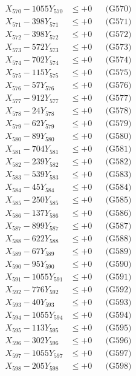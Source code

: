 \documentclass[a4paper,10pt]{article}
\begin{document}
{\begin{align}
X_{570} - 1055Y_{570} &\leq +0 && \text{(G570)} \\
\allowbreak
X_{571} - 398Y_{571} &\leq +0 && \text{(G571)} \\
X_{572} - 398Y_{572} &\leq +0 && \text{(G572)} \\
X_{573} - 572Y_{573} &\leq +0 && \text{(G573)} \\
X_{574} - 702Y_{574} &\leq +0 && \text{(G574)} \\
X_{575} - 115Y_{575} &\leq +0 && \text{(G575)} \\
X_{576} - 57Y_{576} &\leq +0 && \text{(G576)} \\
X_{577} - 912Y_{577} &\leq +0 && \text{(G577)} \\
X_{578} - 24Y_{578} &\leq +0 && \text{(G578)} \\
X_{579} - 62Y_{579} &\leq +0 && \text{(G579)} \\
X_{580} - 89Y_{580} &\leq +0 && \text{(G580)} \\
\allowbreak
X_{581} - 704Y_{581} &\leq +0 && \text{(G581)} \\
X_{582} - 239Y_{582} &\leq +0 && \text{(G582)} \\
X_{583} - 539Y_{583} &\leq +0 && \text{(G583)} \\
X_{584} - 45Y_{584} &\leq +0 && \text{(G584)} \\
X_{585} - 250Y_{585} &\leq +0 && \text{(G585)} \\
X_{586} - 137Y_{586} &\leq +0 && \text{(G586)} \\
X_{587} - 899Y_{587} &\leq +0 && \text{(G587)} \\
X_{588} - 622Y_{588} &\leq +0 && \text{(G588)} \\
X_{589} - 67Y_{589} &\leq +0 && \text{(G589)} \\
X_{590} - 95Y_{590} &\leq +0 && \text{(G590)} \\
\allowbreak
X_{591} - 1055Y_{591} &\leq +0 && \text{(G591)} \\
X_{592} - 776Y_{592} &\leq +0 && \text{(G592)} \\
X_{593} - 40Y_{593} &\leq +0 && \text{(G593)} \\
X_{594} - 1055Y_{594} &\leq +0 && \text{(G594)} \\
X_{595} - 113Y_{595} &\leq +0 && \text{(G595)} \\
X_{596} - 302Y_{596} &\leq +0 && \text{(G596)} \\
X_{597} - 1055Y_{597} &\leq +0 && \text{(G597)} \\
X_{598} - 205Y_{598} &\leq +0 && \text{(G598)} \\

\end{align}}
\end{document}
